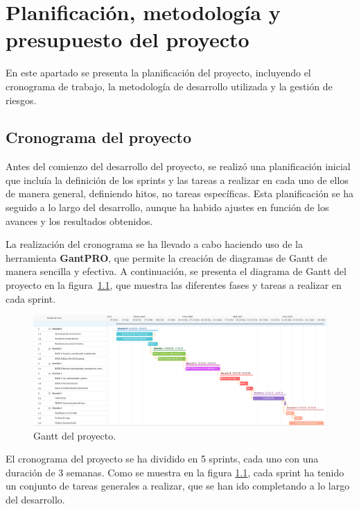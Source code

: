 \chapter{Planificación, metodología y presupuesto del proyecto}\label{cap:planificacion}

En este apartado se presenta la planificación del proyecto, incluyendo el cronograma de trabajo, la metodología de desarrollo utilizada y la gestión de riesgos.

\section{Cronograma del proyecto}

Antes del comienzo del desarrollo del proyecto, se realizó una planificación inicial que incluía la definición de los sprints y las tareas a realizar en cada uno de ellos de manera general, definiendo hitos, no tareas específicas. Esta planificación se ha seguido a lo largo del desarrollo, aunque ha habido ajustes en función de los avances y los resultados obtenidos.

La realización del cronograma se ha llevado a cabo haciendo uso de la herramienta \textbf{GantPRO}\cite{webGanttPro}, que permite la creación de diagramas de Gantt de manera sencilla y efectiva. A continuación, se presenta el diagrama de Gantt del proyecto en la figura~\ref{gantt}, que muestra las diferentes fases y tareas a realizar en cada sprint.

\begin{figure}[ht!] 
    \centering 
    \includegraphics[width=1\textwidth]{figures/04_gantt.png}
    \caption{Gantt del proyecto.} 
    \label{gantt}
\end{figure}

El cronograma del proyecto se ha dividido en 5 sprints, cada uno con una duración de 3 semanas. Como se muestra en la figura \ref{gantt}, cada sprint ha tenido un conjunto de tareas generales a realizar, que se han ido completando a lo largo del desarrollo.

